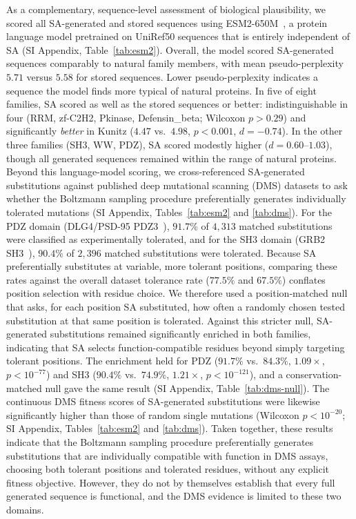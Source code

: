 As a complementary, sequence-level assessment of biological plausibility, we scored all SA-generated and stored sequences using ESM2-650M~\cite{linEvolutionaryScaleModeling2023}, a protein language model pretrained on UniRef50 sequences that is entirely independent of SA (SI Appendix, Table~\ref{tab:esm2}). Overall, the model scored SA-generated sequences comparably to natural family members, with mean pseudo-perplexity $5.71$ versus $5.58$ for stored sequences. Lower pseudo-perplexity indicates a sequence the model finds more typical of natural proteins. In five of eight families, SA scored as well as the stored sequences or better: indistinguishable in four (RRM, zf-C2H2, Pkinase, Defensin\_beta; Wilcoxon $p > 0.29$) and significantly \emph{better} in Kunitz ($4.47$ vs.\ $4.98$, $p < 0.001$, $d{=}{-}0.74$). In the other three families (SH3, WW, PDZ), SA scored modestly higher ($d{=}0.60$--$1.03$), though all generated sequences remained within the range of natural proteins. Beyond this language-model scoring, we cross-referenced SA-generated substitutions against published deep mutational scanning (DMS) datasets to ask whether the Boltzmann sampling procedure preferentially generates individually tolerated mutations (SI Appendix, Tables~\ref{tab:esm2} and \ref{tab:dms}). For the PDZ domain (DLG4/PSD-95 PDZ3~\cite{mclaughlinSpatialArchitecture2012}), $91.7\%$ of $4{,}313$ matched substitutions were classified as experimentally tolerated, and for the SH3 domain (GRB2 SH3~\cite{faureDoubleDMS2022}), $90.4\%$ of $2{,}396$ matched substitutions were tolerated. Because SA preferentially substitutes at variable, more tolerant positions, comparing these rates against the overall dataset tolerance rate ($77.5\%$ and $67.5\%$) conflates position selection with residue choice. We therefore used a position-matched null that asks, for each position SA substituted, how often a randomly chosen tested substitution at that same position is tolerated. Against this stricter null, SA-generated substitutions remained significantly enriched in both families, indicating that SA selects function-compatible residues beyond simply targeting tolerant positions. The enrichment held for PDZ ($91.7\%$ vs.\ $84.3\%$, $1.09\times$, $p < 10^{-77}$) and SH3 ($90.4\%$ vs.\ $74.9\%$, $1.21\times$, $p < 10^{-121}$), and a conservation-matched null gave the same result (SI Appendix, Table~\ref{tab:dms-null}). The continuous DMS fitness scores of SA-generated substitutions were likewise significantly higher than those of random single mutations (Wilcoxon $p < 10^{-20}$; SI Appendix, Tables~\ref{tab:esm2} and \ref{tab:dms}). Taken together, these results indicate that the Boltzmann sampling procedure preferentially generates substitutions that are individually compatible with function in DMS assays, choosing both tolerant positions and tolerated residues, without any explicit fitness objective. However, they do not by themselves establish that every full generated sequence is functional, and the DMS evidence is limited to these two domains.

